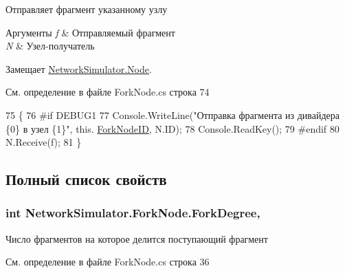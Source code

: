 Отправляет фрагмент указанному узлу 


\begin{DoxyParams}{Аргументы}
{\em f} & Отправляемый фрагмент\\
\hline
{\em N} & Узел-\/получатель\\
\hline
\end{DoxyParams}


Замещает \hyperlink{class_network_simulator_1_1_node_abcda5067b8842a447b2ad293818fc319}{Network\+Simulator.\+Node}.



См. определение в файле Fork\+Node.\+cs строка 74


\begin{DoxyCode}
75         \{
76 \textcolor{preprocessor}{#if DEBUG1}
77             Console.WriteLine(\textcolor{stringliteral}{"Отправка фрагмента из дивайдера \{0\} в узел \{1\}"}, this.
      \hyperlink{class_network_simulator_1_1_fork_node_a13432354bc104beb3ec98ba28d4966cb}{ForkNodeID}, N.ID);
78             Console.ReadKey();
79 \textcolor{preprocessor}{#endif}
80             N.Receive(f);
81         \}
\end{DoxyCode}


\subsection{Полный список свойств}
\subsubsection[{\texorpdfstring{Fork\+Degree}{ForkDegree}}]{\setlength{\rightskip}{0pt plus 5cm}int Network\+Simulator.\+Fork\+Node.\+Fork\+Degree\hspace{0.3cm}{\ttfamily [get]}, {\ttfamily [private]}}\hypertarget{class_network_simulator_1_1_fork_node_afce4020751cd59e8715309dae27501c8}{}\label{class_network_simulator_1_1_fork_node_afce4020751cd59e8715309dae27501c8}


Число фрагментов на которое делится поступающий фрагмент 



См. определение в файле Fork\+Node.\+cs строка 36

